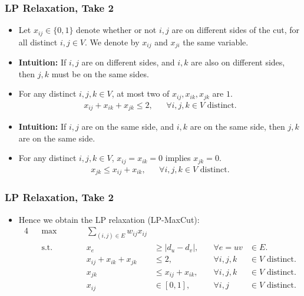 \documentclass{beamer}
\begin{document}
    \begin{frame}
        \frametitle{LP Relaxation, Take 2}
    
        \begin{itemize}
            \item Let $x_{ij} \in \{ 0, 1 \}$ denote whether or not $i, j$ are on different sides of the cut, for all distinct $i, j \in V$. We denote by $x_{ij}$ and $x_{ji}$ the same variable. \pause
            \item {\bf Intuition:} If $i, j$ are on different sides, and $i, k$ are also on different sides, then $j, k$ must be on the same sides. \pause
            \item For any distinct $i, j, k \in V$, at most two of $x_{ij}, x_{ik}, x_{jk}$ are $1$. \pause
            \begin{align*}
                x_{ij} + x_{ik} + x_{jk} \leq 2, && \forall i, j, k \in V \text{ distinct}.
            \end{align*}
            \pause
            \vspace{-1em}
            \item {\bf Intuition:} If $i, j$ are on the same side, and $i, k$ are on the same side, then $j, k$ are on the same side. \pause
            \item For any distinct $i, j, k \in V$, $x_{ij} = x_{ik} = 0$ implies $x_{jk} = 0$. \pause
            \begin{align*}
                x_{jk} \leq x_{ij} + x_{ik}, && \forall i, j, k \in V \text{ distinct}.
            \end{align*}
        \end{itemize}
    \end{frame}

    \begin{frame}
        \frametitle{LP Relaxation, Take 2}
    
        \begin{itemize}
            \item Hence we obtain the LP relaxation {\sc (LP-MaxCut)}:
            \begin{alignat*}{4}
                && \max \qquad && \sum_{(i, j) \in E} w_{ij} x_{ij} \\
                && \text{s.t.} \qquad && x_e & \geq \left|d_u - d_v\right|, & \quad \forall e = uv & \in E. \\
                && && x_{ij} + x_{ik} + x_{jk} & \leq 2, & \quad \forall i, j, k & \in V \text{ distinct}. \\
                && && x_{jk} & \leq x_{ij} + x_{ik}, & \quad \forall i, j, k & \in V \text{ distinct}. \\
                && && x_{ij} & \in [0, 1], & \quad \forall i, j & \in V \text{ distinct}.
              \end{alignat*}
        \end{itemize}
    \end{frame}
\end{document}
